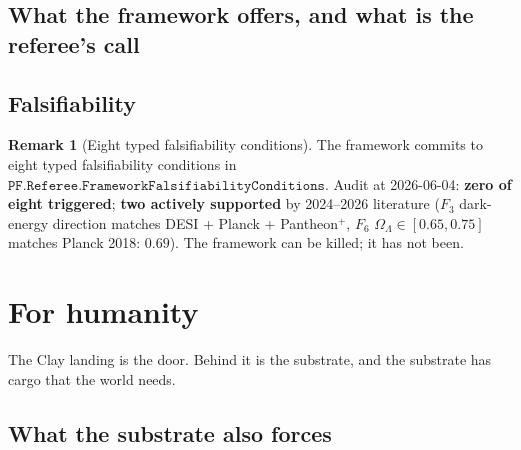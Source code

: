 \documentclass[11pt,a4paper]{article}
\theoremstyle{plain}
\theoremstyle{definition}
\newtheorem{remark}[theorem]{Remark}
\begin{document}
\subsection{What the framework offers, and what is the
referee's call}
\label{sec:offers}

\noindent{}

\subsection{Falsifiability}
\label{sec:falsifiability}

\begin{remark}[Eight typed falsifiability conditions]
\label{rem:falsifiability}
The framework commits to eight typed falsifiability conditions in
$\mathtt{PF.Referee.FrameworkFalsifiabilityConditions}$. Audit at
2026-06-04: \textbf{zero of eight triggered}; \textbf{two actively
supported} by 2024--2026 literature ($F_{3}$ dark-energy direction
matches DESI + Planck + Pantheon$^{+}$, $F_{6}$
$\Omega_{\Lambda} \in [0.65, 0.75]$ matches Planck 2018: $0.69$).
The framework can be killed; it has not been.
\end{remark}

\section{For humanity}
\label{sec:for-humanity}

The Clay landing is the door. Behind it is the substrate, and the
substrate has cargo that the world needs.

\subsection{What the substrate also forces}
\label{sec:also-forces}
\end{document}
